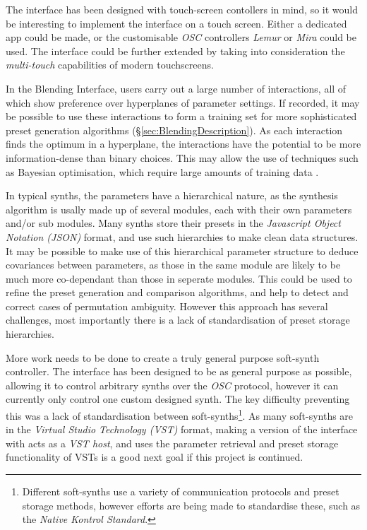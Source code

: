 \documentclass[11pt, oneside]{report}   	%
\begin{document}
{The interface has been designed with touch-screen contollers in mind, so it would be interesting to implement the interface on a touch screen. Either a dedicated app could be made, or the customisable \emph{OSC} controllers \emph{Lemur} or \emph{Mira} could be used. The interface could be further extended by taking into consideration the \emph{multi-touch} capabilities of modern touchscreens.

In the Blending Interface, users carry out a large number of interactions, all of which show preference over hyperplanes of parameter settings. If recorded, it may be possible to use these interactions to form a training set for more sophisticated preset generation algorithms (\S \ref{sec:BlendingDescription}). As each interaction finds the optimum in a hyperplane, the interactions have the potential to be more information-dense than binary choices. This may allow the use of techniques such as Bayesian optimisation, which require large amounts of training data \cite{PreferenceGallery}. 
%

In typical synths, the parameters have a hierarchical nature, as the synthesis algorithm is usally made up of several modules, each with their own parameters and/or sub modules. Many synths store their presets in the \emph{Javascript Object Notation (JSON)} format, and use such hierarchies to make clean data structures. It may be possible to make use of this hierarchical parameter structure to deduce covariances between parameters, as those in the same module are likely to be much more co-dependant than those in seperate modules. This could be used to refine the preset generation and comparison algorithms, and help to detect and correct cases of permutation ambiguity. However this approach has several challenges, most importantly there is a lack of standardisation of preset storage hierarchies.

More work needs to be done to create a truly general purpose soft-synth controller. The interface has been designed to be as general purpose as possible, allowing it to control arbitrary synths over the \emph{OSC} protocol, however it can currently only control one custom designed synth. The key difficulty preventing this was a lack of standardisation between soft-synths\footnote{Different soft-synths use a variety of communication protocols and preset storage methods, however efforts are being made to standardise these, such as the \emph{Native Kontrol Standard}.}. As many soft-synths are in the \emph{Virtual Studio Technology (VST)} format, making a version of the interface with acts as a \emph{VST host}, and uses the parameter retrieval and preset storage functionality of VSTs is a good next goal if this project is continued.

}
\end{document}
